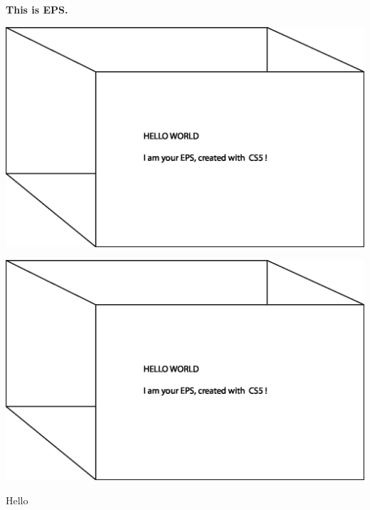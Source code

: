 \documentclass[11pt]{article}
\begin{document}
{\bfseries This is EPS.}
\begin{center}
\includegraphics[width=1.0\textwidth]{bild-01.eps}
\end{center}






\clearpage
 
\begin{minipage}[c]{0.45\textwidth}
\includegraphics[width=\linewidth]{bild-01.eps}
\end{minipage}
\hspace{0.5cm}
\begin{minipage}[c]{0.45\textwidth}
Hello
\end{minipage}
\end{document}
